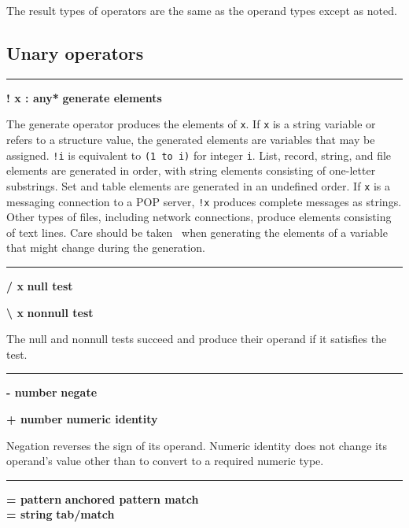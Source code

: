 The result types of operators are the same as the
operand types except as noted.

\subsection*{Unary operators}

\bigskip\hrule\vspace{0.1cm}
\noindent
{\bf ! x : any* } \hfill {\bf generate elements}

\noindent
{}The generate
operator produces the elements of \texttt{x}. If
\texttt{x} is a string variable or refers to a structure value, the
generated elements are variables that may be assigned. \texttt{!i} is
equivalent to \texttt{(1 to i)} for integer \texttt{i}. List, record,
string, and file elements are generated in order, with string elements
consisting of one-letter substrings. Set and table elements are
generated in an undefined order. If \texttt{x} is a messaging
connection to a POP server, \texttt{!x} produces complete messages as
strings. Other types of files, including network connections, produce
elements consisting of text lines.
Care should be taken \WarningNotThreadSafe\ when generating the elements
of a variable that might change during the generation.

\bigskip\hrule\vspace{0.1cm}
\noindent
{\bf / x } \hfill {\bf null test}

\noindent
{\bf {\textbackslash} x } \hfill {\bf nonnull test}

\noindent
The null and nonnull tests succeed
and produce their operand if it satisfies the test.

\bigskip\hrule\vspace{0.1cm}
\noindent
{\bf {}- number } \hfill {\bf negate}

\noindent
{\bf + number } \hfill {\bf numeric identity}

\noindent
Negation reverses the sign of its operand. Numeric identity does not
change its operand's value other than to convert to a
required numeric type.

\bigskip\hrule\vspace{0.1cm}
\noindent
{\bf = pattern } \hfill {\bf anchored pattern match} \\
{\bf = string } \hfill {\bf tab/match} \\

